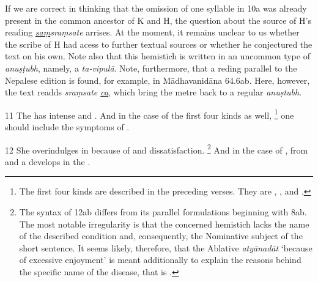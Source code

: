 If we are correct in thinking that the omission of one syllable in 10a was already present in the common ancestor of K and H, the question about the source of H's reading \emph{\underline{saṃ}sraṃsate} arrises. At the moment, it remains unclear to us whether the scribe of H had acess to further textual sources or whether he conjectured the text on his own. Note also that this hemistich is written in an uncommon type of \emph{anuṣṭubh}, namely, a \emph{ta-vipulā}. Note, furthermore, that a reding parallel to the Nepalese edition is found, for example, in Mādhavanidāna 64.6ab. Here, however, the text readds \emph{sraṃsate \underline{ca}}, which bring the metre back to a regular \emph{anuṣtubh}.  

\begin{translation}
\item [11] The  has intense  and .
And in the case of the first four kinds as well,%
	\footnote{%
	The first four kinds are described in the preceding verses. They are , ,  and .
	} 
	one should include the symptoms of .

\item [12]
She overindulges in  because of  and dissatisfaction.%
	\footnote{%
	The syntax of 12ab differs from its parallel formulations beginning with 8ab. The most notable irregularity is that the concerned hemistich lacks the name of the described condition and, consequently, the Nominative subject of the short sentence. It seems likely, therefore, that the Ablative \textit{atyānadāt} ‘because of excessive enjoyment’ is meant additionally to explain the reasons behind the specific name of the disease, that is .
	}
And in the case of , from  and  a  develops in the . 


\end{translation}

